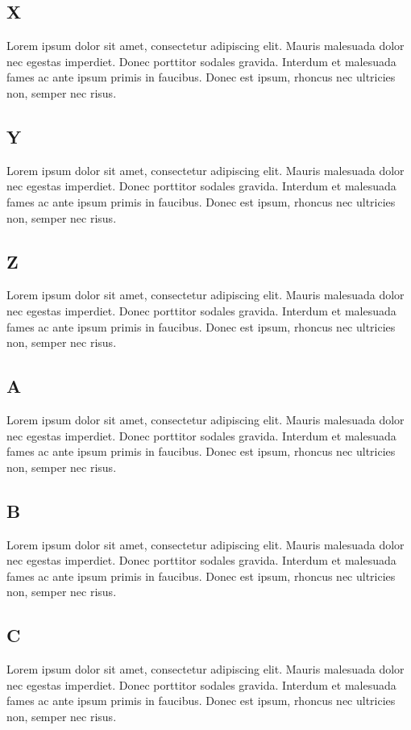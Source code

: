 \documentclass[11pt, a4paper]{article}
\begin{document}
\subsection{X}
Lorem ipsum dolor sit amet, consectetur adipiscing elit. Mauris malesuada dolor nec egestas imperdiet. Donec porttitor sodales gravida. Interdum et malesuada fames ac ante ipsum primis in faucibus. Donec est ipsum, rhoncus nec ultricies non, semper nec risus.
\subsection{Y}
Lorem ipsum dolor sit amet, consectetur adipiscing elit. Mauris malesuada dolor nec egestas imperdiet. Donec porttitor sodales gravida. Interdum et malesuada fames ac ante ipsum primis in faucibus. Donec est ipsum, rhoncus nec ultricies non, semper nec risus.
\subsection{Z}
Lorem ipsum dolor sit amet, consectetur adipiscing elit. Mauris malesuada dolor nec egestas imperdiet. Donec porttitor sodales gravida. Interdum et malesuada fames ac ante ipsum primis in faucibus. Donec est ipsum, rhoncus nec ultricies non, semper nec risus.
\subsection{A}
Lorem ipsum dolor sit amet, consectetur adipiscing elit. Mauris malesuada dolor nec egestas imperdiet. Donec porttitor sodales gravida. Interdum et malesuada fames ac ante ipsum primis in faucibus. Donec est ipsum, rhoncus nec ultricies non, semper nec risus.
\subsection{B}
Lorem ipsum dolor sit amet, consectetur adipiscing elit. Mauris malesuada dolor nec egestas imperdiet. Donec porttitor sodales gravida. Interdum et malesuada fames ac ante ipsum primis in faucibus. Donec est ipsum, rhoncus nec ultricies non, semper nec risus.
\subsection{C}
Lorem ipsum dolor sit amet, consectetur adipiscing elit. Mauris malesuada dolor nec egestas imperdiet. Donec porttitor sodales gravida. Interdum et malesuada fames ac ante ipsum primis in faucibus. Donec est ipsum, rhoncus nec ultricies non, semper nec risus.
\end{document}
